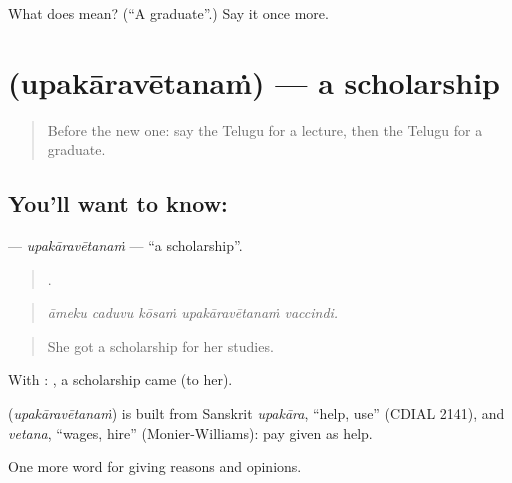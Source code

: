 \begin{tcolorbox}[breakable,colback=teal!4,colframe=teal!35!black,title={Before you move on}]
What does  mean? (\textquotedblleft{}A graduate\textquotedblright{}.) Say it once more.
\end{tcolorbox}
\section[\texorpdfstring{\te{ఉపకారవేతనం} (upakāravētanaṁ)}{ఉపకారవేతనం (upakāravētanaṁ)}]{ (upakāravētanaṁ) — a scholarship}

\label{lesson:TE-C414-upakaravetanam}



\begin{quote}
Before the new one: say the Telugu for a lecture, then the Telugu for a graduate.
\end{quote}

\subsection*{You'll want to know: }
\textbf{} — \emph{upakāravētanaṁ} — \textquotedblleft{}a scholarship\textquotedblright{}.

\begin{quote}
    .
\end{quote}

\begin{quote}
\emph{āmeku caduvu kōsaṁ upakāravētanaṁ vaccindi.}
\end{quote}

\begin{quote}
She got a scholarship for her studies.
\end{quote}

With :  , a scholarship came (to her).

\begin{cousinweb}
\textbf{} (\emph{upakāravētanaṁ}) is built from Sanskrit \emph{upakāra}, \textquotedblleft{}help, use\textquotedblright{} (CDIAL 2141), and \emph{vetana}, \textquotedblleft{}wages, hire\textquotedblright{} (Monier-Williams): pay given as help.
\end{cousinweb}

\begin{grammarlens}[title={What you've built}]
One more word for giving reasons and opinions.
\end{grammarlens}

